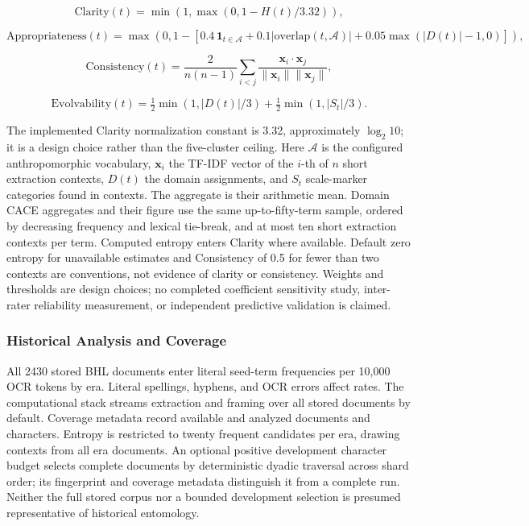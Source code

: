 \documentclass[
]{article}
\numberwithin{equation}{section}
\begin{document}
\begin{equation}\label{eq:cace_clarity}
\mathrm{Clarity}(t)=\min(1,\max(0,1-H(t)/3.32)),
\end{equation}

\begin{equation}\label{eq:cace_appropriateness}
\mathrm{Appropriateness}(t)=\max(0,1-[0.4\,\mathbf{1}_{t\in\mathcal A}+0.1|\mathrm{overlap}(t,\mathcal A)|+0.05\max(|D(t)|-1,0)]),
\end{equation}

\begin{equation}\label{eq:cace_consistency}
\mathrm{Consistency}(t)=\frac{2}{n(n-1)}\sum_{i<j}\frac{\mathbf x_i\cdot\mathbf x_j}{\|\mathbf x_i\|\|\mathbf x_j\|},
\end{equation}

\begin{equation}\label{eq:cace_evolvability}
\mathrm{Evolvability}(t)=\tfrac12\min(1,|D(t)|/3)+\tfrac12\min(1,|S_t|/3).
\end{equation}

The implemented Clarity normalization constant is 3.32, approximately
\(\log_2 10\); it is a design choice rather than the five-cluster
ceiling. Here \(\mathcal A\) is the configured anthropomorphic
vocabulary, \(\mathbf x_i\) the TF-IDF vector of the \(i\)-th of \(n\)
short extraction contexts, \(D(t)\) the domain assignments, and \(S_t\)
scale-marker categories found in contexts. The aggregate is their
arithmetic mean. Domain CACE aggregates and their figure use the same
up-to-fifty-term sample, ordered by decreasing frequency and lexical
tie-break, and at most ten short extraction contexts per term. Computed
entropy enters Clarity where available. Default zero entropy for
unavailable estimates and Consistency of 0.5 for fewer than two contexts
are conventions, not evidence of clarity or consistency. Weights and
thresholds are design choices; no completed coefficient sensitivity
study, inter-rater reliability measurement, or independent predictive
validation is claimed.

\subsubsection{Historical Analysis and
Coverage}\label{historical-analysis-and-coverage}

All 2430 stored BHL documents enter literal seed-term frequencies per
10,000 OCR tokens by era. Literal spellings, hyphens, and OCR errors
affect rates. The computational stack streams extraction and framing
over all stored documents by default. Coverage metadata record available
and analyzed documents and characters. Entropy is restricted to twenty
frequent candidates per era, drawing contexts from all era documents. An
optional positive development character budget selects complete
documents by deterministic dyadic traversal across shard order; its
fingerprint and coverage metadata distinguish it from a complete run.
Neither the full stored corpus nor a bounded development selection is
presumed representative of historical entomology.
\end{document}

